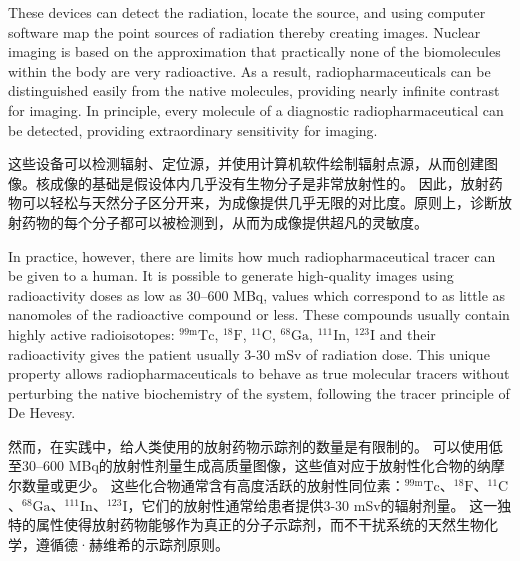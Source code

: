 \documentclass[dvipsnames, svgnames,a4paper,11pt]{article}
\begin{document}
These devices can detect the radiation, locate the source, and using computer software map the point sources of radiation thereby creating images. Nuclear imaging is based on the approximation that practically none of the biomolecules within the body are very radioactive.  As a result, radiopharmaceuticals can be distinguished easily from the native molecules, providing nearly infinite contrast for imaging. In principle, every molecule of a diagnostic radiopharmaceutical can be detected, providing extraordinary sensitivity for imaging.

这些设备可以检测辐射、定位源，并使用计算机软件绘制辐射点源，从而创建图像。核成像的基础是假设体内几乎没有生物分子是非常放射性的。  因此，放射药物可以轻松与天然分子区分开来，为成像提供几乎无限的对比度。原则上，诊断放射药物的每个分子都可以被检测到，从而为成像提供超凡的灵敏度。

In practice, however, there are limits how much radiopharmaceutical tracer can be given to a human.  It is possible to generate high-quality images using radioactivity doses as low as 30–600 MBq, values which correspond to as little as nanomoles of the radioactive compound or less.  These compounds usually contain highly active radioisotopes: ${}^\text{99m}\text{Tc}$, ${}^{18}\text{F}$, ${}^{11}\text{C}$, ${}^\text{68}\text{Ga}$, ${}^\text{111}\text{In}$, ${}^\text{123}\text{I}$ and their radioactivity gives the patient usually 3-30 mSv of radiation dose.  This unique property allows radiopharmaceuticals to behave as true molecular tracers without perturbing the native biochemistry of the system, following the tracer principle of De Hevesy.

然而，在实践中，给人类使用的放射药物示踪剂的数量是有限制的。  可以使用低至30–600 MBq的放射性剂量生成高质量图像，这些值对应于放射性化合物的纳摩尔数量或更少。 这些化合物通常含有高度活跃的放射性同位素：${}^\text{99m}\text{Tc}$、${}^{18}\text{F}$、${}^{11}\text{C}$、${}^\text{68}\text{Ga}$、${}^\text{111}\text{In}$、${}^\text{123}\text{I}$，它们的放射性通常给患者提供3-30 mSv的辐射剂量。  这一独特的属性使得放射药物能够作为真正的分子示踪剂，而不干扰系统的天然生物化学，遵循德·赫维希的示踪剂原则。
\end{document}
